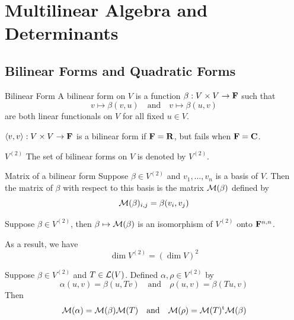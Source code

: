\documentclass[12pt,a4paper]{article}
\begin{document}
    \section{Multilinear Algebra and Determinants}
    \subsection{Bilinear Forms and Quadratic Forms}
    \begin{defi}{Bilinear Form}
        A bilinear form on $V$ is a function $\beta:V\times V\to\mathbf{F}$ such that
        $$
        v\mapsto\beta(v,u)\quad\text{and}\quad v\mapsto\beta(u,v)
        $$
        are both linear functionals on $V$ for all fixed $u\in V$.
    \end{defi}
    \begin{remark}
        $\langle v,v\rangle:V\times V\to\mathbf{F}$ is a bilinear form if $\mathbf{F}=\mathbf{R}$, but fails when $\mathbf{F}=\mathbf{C}$.
    \end{remark}
    \hfill
    
    \begin{notation}{$V^{(2)}$}
        The set of bilinear forms on $V$ is denoted by $V^{(2)}$.
    \end{notation}
    \hfill
    
    \begin{defi}{Matrix of a bilinear form}\addelement{$\lmat{\beta}$}
        Suppose $\beta\in V^{(2)}$ and $v_1,\dots,v_n$ is a basis of $V$. Then the matrix of $\beta$ with respect to this basis is the  matrix $\lmat{\beta}$ defined by
        $$
        \mathcal{M}(\beta)_{i,j}=\beta(v_i,v_j)
        $$
    \end{defi}
    \hfill
    
    \begin{prop}
        Suppose $\beta\in V^{(2)}$, then $\beta\mapsto\mathcal{M}(\beta)$ is an isomorphism of $V^{(2)}$ onto $\mathbf{F}^{n,n}$.
    \end{prop}
    \begin{remark}
        As a result, we have 
        $$
        \dim V^{(2)}=(\dim V)^2
        $$
    \end{remark}
    \hfill

    \begin{prop}
        Suppose $\beta\in V^{(2)}$ and $T\in\mathcal{L}(V)$. Defined $\alpha,\rho\in V^{(2)}$ by
        $$
        \alpha(u,v)=\beta(u,Tv)\quad\text{and}\quad\rho(u,v)=\beta(Tu,v)
        $$
        Then
        $$
        \mathcal{M}(\alpha)=\mathcal{M}(\beta)\mathcal{M}(T)\quad\text{and}\quad\mathcal{M}(\rho)=\mathcal{M}(T)^\mathrm{t}\mathcal{M}(\beta)
        $$
    \end{prop}
    \hfill
\end{document}
